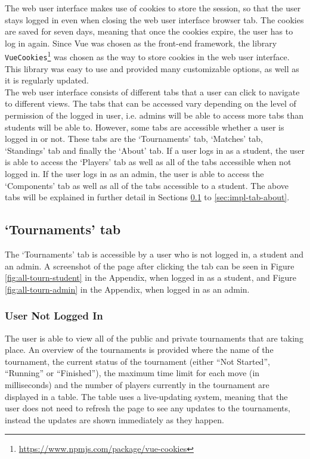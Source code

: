 \documentclass[a4paper, 11pt]{report}
\begin{document}
The web user interface makes use of cookies to store the session, so that the
user stays logged in even when closing the web user interface browser tab. The
cookies are saved for seven days, meaning that once the cookies expire, the
user has to log in again. Since Vue was chosen as the front-end framework, the
library \texttt{VueCookies}\footnote{\url{https://www.npmjs.com/package/vue-cookies}}
was chosen as the way to store cookies in the web user interface. This library
was easy to use and provided many customizable options, as well as it is
regularly updated. \\

The web user interface consists of different tabs that a user can click to navigate
to different views. The tabs that can be accessed vary depending on the level of
permission of the logged in user, i.e. admins will be able to access more tabs
than students will be able to. However, some tabs are accessible whether a user
is logged in or not. These tabs are the `Tournaments' tab, `Matches' tab,
`Standings' tab and finally the `About' tab. If a user logs in as a student, the
user is able to access the `Players' tab as well as all of the tabs accessible
when not logged in. If the user logs in as an admin, the user is able to access
the `Components' tab as well as all of the tabs accessible to a student. The
above tabs will be explained in further detail in Sections
\ref{sec:impl-tab-tournaments} to \ref{sec:impl-tab-about}.

\subsection{`Tournaments' tab}
\label{sec:impl-tab-tournaments}

The `Tournaments' tab is accessible by a user who is not logged in, a student
and an admin. A screenshot of the page after clicking the tab can be seen in
Figure \ref{fig:all-tourn-student} in the Appendix, when logged in as a student,
and Figure \ref{fig:all-tourn-admin} in the Appendix, when logged in as an
admin.

\subsubsection*{User Not Logged In}

The user is able to view all of the public and private tournaments that are
taking place. An overview of the tournaments is provided where the name of the
tournament, the current status of the tournament (either ``Not Started'',
``Running'' or ``Finished''), the maximum time limit for each move (in milliseconds)
and the number of players currently in the tournament are displayed in a table.
The table uses a live-updating system, meaning that the user does not need to
refresh the page to see any updates to the tournaments, instead the updates are
shown immediately as they happen. \\
\end{document}
